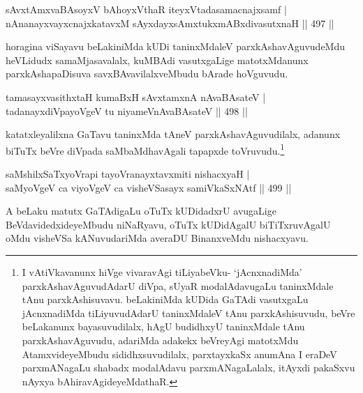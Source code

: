
\begin{shl}
sAvxtAmxvaBAsoyxV bAhoyxV\s thaR iteyxVtadasamacnajxsamf | \\
nAnanayxvayxcnajxkatavxM sAyxdayxsAmxtukxmABxdivasutxnaH \hfill||  497 || 
\end{shl}

\begin{artha}
horagina viSayavu beLakiniMda kUDi taninxMdaleV parxkAshavAguvudeMdu heVLidudx samaMjasavalalx, kuMBAdi vasutxgaLige matotxMdanunx parxkAshapaDisuva savxBAvavilalxveMbudu bArade hoVguvudu.
\end{artha}


\begin{shl}
tamasayxvasithxtaH kumaBxH sAvxtamxnA nAvaBAsateV | \\
tadanayxdiVpayoVgeV tu niyameVnAvaBAsateV \hfill||  498 ||  
\end{shl}

\begin{artha}
katatxleyalilxna GaTavu taninxMda tAneV parxkAshavAguvudilalx, adanunx biTuTx beVre diVpada saMbaMdhavAgali tapapxde toVruvudu.\footnote{I vAtiVkavanunx hiVge vivaravAgi tiLiyabeVku- `jAcnxnadiMda' parxkAshavAguvudAdarU diVpa, sUyaR modalAdavugaLu taninxMdale tAnu parxkAshisuvavu. beLakiniMda kUDida GaTAdi vasutxgaLu jAcnxnadiMda tiLiyuvudAdarU taninxMdaleV tAnu parxkAshisuvudu, beVre beLakanunx bayasuvudilalx, hAgU budidhxyU taninxMdale tAnu parxkAshavAguvudu, adariMda adakekx beVreyAgi matotxMdu AtamxvideyeMbudu sididhxsuvudilalx, parxtayxkaSx anumAna I eraDeV parxmANagaLu shabadx modalAdavu parxmANagaLalalx, itAyxdi pakaSxvu nAyxya bAhiravAgideyeMdathaR.}
\end{artha}


\begin{shl}
saMshilxSaTxyoVrapi tayoVranayxtavxmiti nishacxyaH | \\
saMyoVgeV ca viyoVgeV ca visheVSasayx samiVkaSxNAtf \hfill||  499 ||  
\end{shl}

\begin{artha}
A beLaku matutx GaTAdigaLu oTuTx kUDidadxrU avugaLige BeVdavidedxideyeMbudu niNaRyavu, oTuTx kUDidAgalU biTiTxruvAgalU oMdu visheVSa kANuvudariMda averaDU BinanxveMdu nishacxyavu.
\end{artha}

